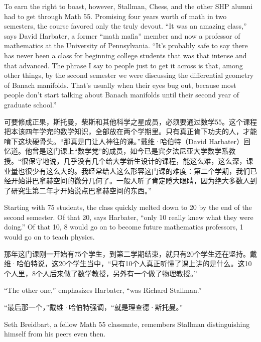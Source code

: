 \ifdefined\eng
To earn the right to boast, however, Stallman, Chess, and the other SHP alumni had to get through Math 55. Promising four years worth of math in two semesters, the course favored only the truly devout. ``It was an amazing class,'' says David Harbater, a former ``math mafia'' member and now a professor of mathematics at the University of Pennsylvania. ``It's probably safe to say there has never been a class for beginning college students that was that intense and that advanced. The phrase I say to people just to get it across is that, among other things, by the second semester we were discussing the differential geometry of Banach manifolds. That's usually when their eyes bug out, because most people don't start talking about Banach manifolds until their second year of graduate school.''
\fi

\ifdefined\chs
可要修成正果，斯托曼，柴斯和其他科学之星成员，必须要通过数学55。这个课程把本该四年学完的数学知识，全部放在两个学期里。只有真正肯下功夫的人，才能啃下这块硬骨头。``那真是门让人神往的课。''戴维·哈伯特（David Harbater）回忆道。他曾是这门课上``数学党''的成员，如今已是宾夕法尼亚大学数学系教授。``很保守地说，几乎没有几个给大学新生设计的课程，能这么难，这么深，课业量也很少有这么大的。我经常给人这么形容这门课的难度：第二个学期，我们已经开始讲巴拿赫空间的微分几何了。一般人听了肯定瞪大眼睛，因为绝大多数人到了研究生第二年才开始说点巴拿赫空间的东西。''
\fi

\ifdefined\eng
Starting with 75 students, the class quickly melted down to 20 by the end of the second semester. Of that 20, says Harbater, ``only 10 really knew what they were doing.'' Of that 10, 8 would go on to become future mathematics professors, 1 would go on to teach physics.
\fi

\ifdefined\chs
那年这门课刚一开始有75个学生，到第二学期结束，就只有20个学生还在坚持。戴维·哈伯特说，这20个学生当中，``只有10个人真正听懂了课上讲的是什么。这10个人里，8个人后来做了数学教授，另外有一个做了物理教授。''
\fi

\ifdefined\eng
``The other one,'' emphasizes Harbater, ``was Richard Stallman.''
\fi

\ifdefined\chs
``最后那一个，''戴维·哈伯特强调，``就是理查德·斯托曼。''
\fi

\ifdefined\eng
Seth Breidbart, a fellow Math 55 classmate, remembers Stallman distinguishing himself from his peers even then.
\fi

